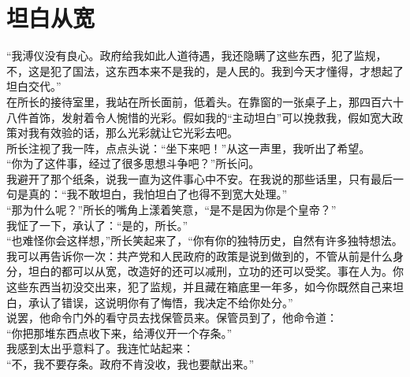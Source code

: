 \fancyhead[RO]{} %
\fancyhead[LE]{} %
\chapter*{坦白从宽}
\thispagestyle{empty}
“我溥仪没有良心。政府给我如此人道待遇，我还隐瞒了这些东西，犯了监规，不，这是犯了国法，这东西本来不是我的，是人民的。我到今天才懂得，才想起了坦白交代。”\\

在所长的接待室里，我站在所长面前，低着头。在靠窗的一张桌子上，那四百六十八件首饰，发射着令人惋惜的光彩。假如我的“主动坦白”可以挽救我，假如宽大政策对我有效验的话，那么光彩就让它光彩去吧。\\

所长注视了我一阵，点点头说：“坐下来吧！”从这一声里，我听出了希望。\\

“你为了这件事，经过了很多思想斗争吧？”所长问。\\

我避开了那个纸条，说我一直为这件事心中不安。在我说的那些话里，只有最后一句是真的：“我不敢坦白，我怕坦白了也得不到宽大处理。”\\

“那为什么呢？”所长的嘴角上漾着笑意，“是不是因为你是个皇帝？”\\

我怔了一下，承认了：“是的，所长。”\\

“也难怪你会这样想，”所长笑起来了，“你有你的独特历史，自然有许多独特想法。我可以再告诉你一次：共产党和人民政府的政策是说到做到的，不管从前是什么身分，坦白的都可以从宽，改造好的还可以减刑，立功的还可以受奖。事在人为。你这些东西当初没交出来，犯了监规，并且藏在箱底里一年多，如今你既然自己来坦白，承认了错误，这说明你有了悔悟，我决定不给你处分。”\\

说罢，他命令门外的看守员去找保管员来。保管员到了，他命令道：\\

“你把那堆东西点收下来，给溥仪开一个存条。”\\

我感到太出乎意料了。我连忙站起来：\\

“不，我不要存条。政府不肯没收，我也要献出来。”\\

